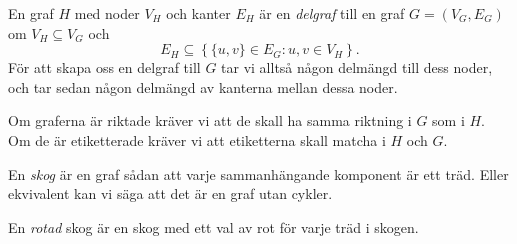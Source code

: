 \documentclass[nobib]{tufte-handout}
\begin{document}
\begin{definition}
    En graf $H$ med noder $V_H$ och kanter $E_H$ är en \emph{delgraf} till en graf $G = (V_G, E_G)$ om $V_H\subseteq V_G$ och 
    $$E_H \subseteq \left\{\{u,v\} \in E_G: u, v \in V_H\right\}.$$
    För att skapa oss en delgraf till $G$ tar vi alltså någon delmängd till dess noder, och tar sedan någon delmängd av kanterna mellan dessa noder.

    Om graferna är riktade kräver vi att de skall ha samma riktning i $G$ som i $H$. Om de är etiketterade kräver vi att etiketterna skall matcha i $H$ och $G$.
\end{definition}

\begin{definition}
    En \emph{skog} är en graf sådan att varje sammanhängande komponent är ett träd. Eller ekvivalent kan vi säga att det är en graf utan cykler.

    En \emph{rotad} skog är en skog med ett val av rot för varje träd i skogen.
\end{definition}
\end{document}
